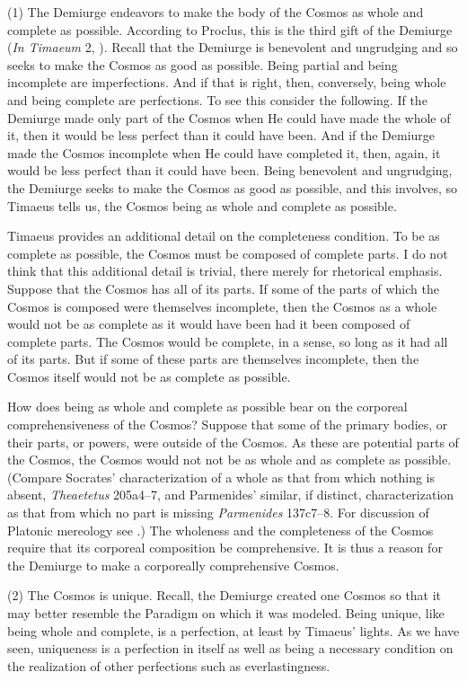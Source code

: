 (1) The Demiurge endeavors to make the body of the Cosmos as whole and complete as possible. According to Proclus, this is the third gift of the Demiurge (\emph{In Timaeum} 2, \citealt{Diehl:1903re}). Recall that the Demiurge is benevolent and ungrudging and so seeks to make the Cosmos as good as possible. Being partial and being incomplete are imperfections. And if that is right, then, conversely, being whole and being complete are perfections. To see this consider the following. If the Demiurge made only part of the Cosmos when He could have made the whole of it, then it would be less perfect than it could have been. And if the Demiurge made the Cosmos incomplete when He could have completed it, then, again, it would be less perfect than it could have been. Being benevolent and ungrudging, the Demiurge seeks to make the Cosmos as good as possible, and this involves, so Timaeus tells us, the Cosmos being as whole and complete as possible.

Timaeus provides an additional detail on the completeness condition. To be as complete as possible, the Cosmos must be composed of complete parts. I do not think that this additional detail is trivial, there merely for rhetorical emphasis. Suppose that the Cosmos has all of its parts. If some of the parts of which the Cosmos is composed were themselves incomplete, then the Cosmos as a whole would not be as complete as it would have been had it been composed of complete parts. The Cosmos would be complete, in a sense, so long as it had all of its parts. But if some of these parts are themselves incomplete, then the Cosmos itself would not be as complete as possible.

How does being as whole and complete as possible bear on the corporeal comprehensiveness of the Cosmos? Suppose that some of the primary bodies, or their parts, or powers, were outside of the Cosmos. As these are potential parts of the Cosmos, the Cosmos would not not be as whole and as complete as possible. (Compare Socrates' characterization of a whole as that from which nothing is absent, \emph{Theaetetus} 205a4--7, and Parmenides' similar, if distinct, characterization as that from which no part is missing \emph{Parmenides} 137c7--8. For discussion of Platonic mereology see \citealt{Harte:2002tl}.) The wholeness and the completeness of the Cosmos require that its corporeal composition be comprehensive. It is thus a reason for the Demiurge to make a corporeally comprehensive Cosmos.

(2) The Cosmos is unique. Recall, the Demiurge created one Cosmos so that it may better resemble the Paradigm on which it was modeled. Being unique, like being whole and complete, is a perfection, at least by Timaeus' lights. As we have seen, uniqueness is a perfection in itself as well as being a necessary condition on the realization of other perfections such as everlastingness.


